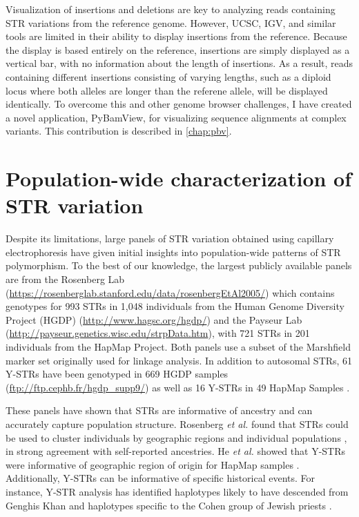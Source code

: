 Visualization of insertions and deletions are key to analyzing reads containing STR variations from the reference genome. However, UCSC, IGV, and similar tools are limited in their ability to display insertions from the reference. Because the display is based entirely on the reference, insertions are simply displayed as a vertical bar, with no information about the length of insertions. As a result, reads containing different insertions consisting of varying lengths, such as a diploid locus where both alleles are longer than the referene allele, will be displayed identically. To overcome this and other genome browser challenges, I have created a novel application, PyBamView, for visualizing sequence alignments at complex variants. This contribution is described in \autoref{chap:pbv}.

\section{Population-wide characterization of STR variation}
Despite its limitations, large panels of STR variation obtained using capillary electrophoresis have  given initial insights into population-wide patterns of STR polymorphism. To the best of our knowledge, the largest publicly available panels are from the Rosenberg Lab (\url{https://rosenberglab.stanford.edu/data/rosenbergEtAl2005/}) which contains genotypes for 993 STRs in 1,048 individuals from the Human Genome Diversity Project (HGDP) (\url{http://www.hagsc.org/hgdp/}) and the Payseur Lab (\url{http://payseur.genetics.wisc.edu/strpData.htm}), with 721 STRs in 201 individuals from the HapMap Project. Both panels use a subset of the Marshfield marker set originally used for linkage analysis. In addition to autosomal STRs, 61 Y-STRs have been genotyped in 669 HGDP samples (\url{ftp://ftp.cephb.fr/hgdp_supp9/}) as well as 16 Y-STRs in 49 HapMap Samples \cite{HeGitschierZerjalEtAl2009}.

These panels have shown that STRs are informative of ancestry and can accurately capture population structure. Rosenberg \emph{et al.} found that STRs could be used to cluster individuals by geographic regions and individual populations \cite{RosenbergPritchardWeberEtAl2002}, in strong agreement with self-reported ancestries. He \emph{et al.} showed that Y-STRs were informative of geographic region of origin for HapMap samples \cite{HeGitschierZerjalEtAl2009}. Additionally, Y-STRs can be informative of specific historical events. For instance, Y-STR analysis has identified haplotypes likely to have descended from Genghis Khan \cite{ZerjalXueBertorelleEtAl2003} and haplotypes specific to the Cohen group of Jewish priests \cite{SkoreckiSeligBlazerEtAl1997}.

